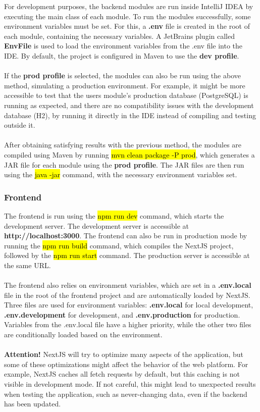\noindent For development purposes, the backend modules are run inside IntelliJ IDEA by executing the main class of each module. To run the modules successfully, some environment variables must be set. For this, a \textbf{.env} file is created in the root of each module, containing the necessary variables. A JetBrains plugin called \textbf{EnvFile} is used to load the environment variables from the .env file into the IDE. By default, the project is configured in Maven to use the \textbf{dev profile}.
\\\\
\noindent If the \textbf{prod profile} is selected, the modules can also be run using the above method, simulating a production environment. For example, it might be more accessible to test that the users module's production database (PostgreSQL) is running as expected, and there are no compatibility issues with the development database (H2), by running it directly in the IDE instead of compiling and testing outside it.
\\\\
\noindent After obtaining satisfying results with the previous method, the modules are compiled using Maven by running \hl{mvn clean package -P prod}, which generates a JAR file for each module using the \textbf{prod profile}. The JAR files are then run using the \hl{java -jar} command, with the necessary environment variables set.

\subsubsection{Frontend}

\noindent The frontend is run using the \hl{npm run dev} command, which starts the development server. The development server is accessible at \textbf{http://localhost:3000}. The frontend can also be run in production mode by running the \hl{npm run build} command, which compiles the NextJS project, followed by the \hl{npm run start} command. The production server is accessible at the same URL.
\\\\
\noindent The frontend also relies on environment variables, which are set in a \textbf{.env.local} file in the root of the frontend project and are automatically loaded by NextJS. Three files are used for environment variables: \textbf{.env.local} for local development, \textbf{.env.development} for development, and \textbf{.env.production} for production. Variables from the .env.local file have a higher priority, while the other two files are conditionally loaded based on the environment.
\\\\
\noindent \textbf{Attention!} NextJS will try to optimize many aspects of the application, but some of these optimizations might affect the behavior of the web platform. For example, NextJS caches all fetch requests by default, but this caching is not visible in development mode. If not careful, this might lead to unexpected results when testing the application, such as never-changing data, even if the backend has been updated.


